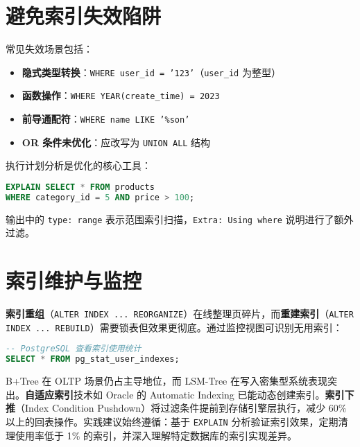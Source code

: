 \section{避免索引失效陷阱}
常见失效场景包括：\par
\begin{itemize}
\item \textbf{隐式类型转换}：\texttt{WHERE user\_{}id = '123'}（\texttt{user\_{}id} 为整型）
\item \textbf{函数操作}：\texttt{WHERE YEAR(create\_{}time) = 2023}
\item \textbf{前导通配符}：\texttt{WHERE name LIKE '\%{}son'}
\item \textbf{OR 条件未优化}：应改写为 \texttt{UNION ALL} 结构
\end{itemize}
执行计划分析是优化的核心工具：\par
\begin{lstlisting}[language=sql]
EXPLAIN SELECT * FROM products 
WHERE category_id = 5 AND price > 100;
\end{lstlisting}
输出中的 \texttt{type: range} 表示范围索引扫描，\texttt{Extra: Using where} 说明进行了额外过滤。\par
\section{索引维护与监控}
\textbf{索引重组}（\texttt{ALTER INDEX ... REORGANIZE}）在线整理页碎片，而\textbf{重建索引}（\texttt{ALTER INDEX ... REBUILD}）需要锁表但效果更彻底。通过监控视图可识别无用索引：\par
\begin{lstlisting}[language=sql]
-- PostgreSQL 查看索引使用统计
SELECT * FROM pg_stat_user_indexes;
\end{lstlisting}
B+Tree 在 OLTP 场景仍占主导地位，而 LSM-Tree 在写入密集型系统表现突出。\textbf{自适应索引}技术如 Oracle 的 Automatic Indexing 已能动态创建索引。\textbf{索引下推}（Index Condition Pushdown）将过滤条件提前到存储引擎层执行，减少 60\%{} 以上的回表操作。实践建议始终遵循：基于 \texttt{EXPLAIN} 分析验证索引效果，定期清理使用率低于 1\%{} 的索引，并深入理解特定数据库的索引实现差异。\par

